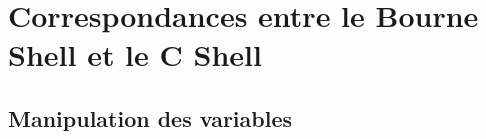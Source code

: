 %
%
\chapter{\label{ann-csh-sh}Correspondances entre le Bourne Shell et le C Shell}
\renewcommand{\arraystretch}{1.5}

\section{Manipulation des variables}

